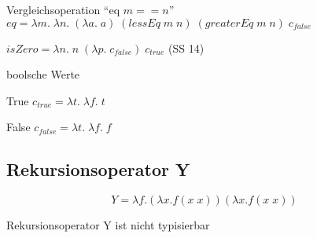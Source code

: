 \begin{compactitem}
\begin{compactitem}
			\item Vergleichsoperation \enquote{eq $m == n$} $eq = \lambda m.\; \lambda n.\; (\lambda a.\; a)\; (lessEq\; m\; n)\; (greaterEq\; m\; n)\; c_{false}$
			\item $isZero = \lambda n.\; n\; (\lambda p.\; c_{false})\; c_{true}$ (SS 14)
		\end{compactitem}
	\item boolsche Werte
		\begin{compactitem}
			\item True $c_{true} = \lambda t.\; \lambda f.\; t$
			\item False $c_{false} = \lambda t.\; \lambda f.\; f$
		\end{compactitem}
\end{compactitem}

\subsection{Rekursionsoperator Y }
$$Y=\lambda f. (\lambda x. f (x\; x))(\lambda x.f(x\; x))$$
\begin{compactitem}
	\item Rekursionsoperator Y ist nicht typisierbar 
\end{compactitem}


